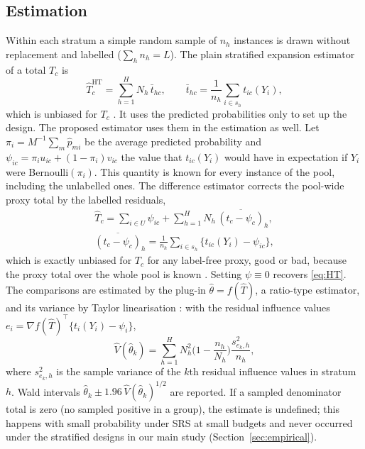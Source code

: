 \documentclass[pdflatex,sn-mathphys-num,iicol]{sn-jnl}
\theoremstyle{thmstyleone}
\theoremstyle{thmstyletwo}
\theoremstyle{thmstylethree}
\begin{document}
\subsection{Estimation}\label{sec:estimation}
Within each stratum a simple random sample of $n_h$ instances is drawn without replacement and labelled ($\sum_h n_h=L$). The plain stratified expansion estimator of a total $T_c$ is
\begin{equation}\label{eq:HT}
\hat T^{\mathrm{HT}}_c=\sum_{h=1}^H N_h\,\bar t_{hc},\qquad \bar t_{hc}=\frac{1}{n_h}\sum_{i\in s_h} t_{ic}(Y_i),
\end{equation}
which is unbiased for $T_c$ \citep{cochran1977}. It uses the predicted probabilities only to set up the design. The proposed estimator uses them in the estimation as well. Let $\pi_i=M^{-1}\sum_m\hat p_{mi}$ be the average predicted probability and $\psi_{ic}=\pi_iu_{ic}+(1-\pi_i)v_{ic}$ the value that $t_{ic}(Y_i)$ would have in expectation if $Y_i$ were Bernoulli$(\pi_i)$. This quantity is known for every instance of the pool, including the unlabelled ones. The difference estimator corrects the pool-wide proxy total by the labelled residuals,
\begin{equation}\label{eq:DIF}
\begin{gathered}
\hat T_c=\sum_{i\in U}\psi_{ic}+\sum_{h=1}^H N_h\,\overline{(t_c-\psi_c)}_{h},\\
\overline{(t_c-\psi_c)}_{h}=\frac1{n_h}\sum_{i\in s_h}\{t_{ic}(Y_i)-\psi_{ic}\},
\end{gathered}
\end{equation}
which is exactly unbiased for $T_c$ for any label-free proxy, good or bad, because the proxy total over the whole pool is known \citep{cassel1976,sarndal1992}. Setting $\psi\equiv0$ recovers \eqref{eq:HT}. The comparisons are estimated by the plug-in $\hat\theta=f(\hat T)$, a ratio-type estimator, and its variance by Taylor linearisation \citep[Section~5.5]{sarndal1992}: with the residual influence values $e_i=\nabla f(\hat T)^{\top}\{t_i(Y_i)-\psi_i\}$,
\begin{equation}\label{eq:var}
\hat V(\hat\theta_k)=\sum_{h=1}^H N_h^2\Big(1-\frac{n_h}{N_h}\Big)\frac{s^2_{e_k,h}}{n_h},
\end{equation}
where $s^2_{e_k,h}$ is the sample variance of the $k$th residual influence values in stratum $h$. Wald intervals $\hat\theta_k\pm 1.96\,\hat V(\hat\theta_k)^{1/2}$ are reported. If a sampled denominator total is zero (no sampled positive in a group), the estimate is undefined; this happens with small probability under SRS at small budgets and never occurred under the stratified designs in our main study (Section~\ref{sec:empirical}).
\end{document}

